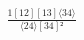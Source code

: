 \documentclass[varwidth, border=5pt]{standalone}
\begin{document}
\begin{my}
$\begin{gathered}
\scriptscriptstyle\frac{1[12][13]⟨34⟩}{⟨24⟩[34]²}
\end{gathered}$
\end{my}
\end{document}

